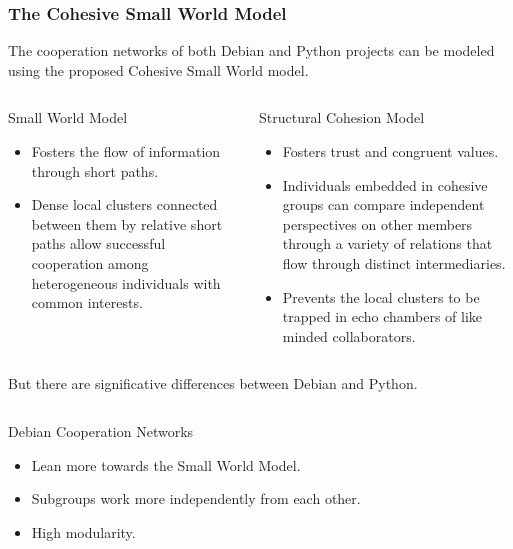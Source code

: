 \documentclass[ignorenonframetext,red,8pt,notes=hide]{beamer}
\begin{document}
\begin{frame}
\frametitle{The Cohesive Small World Model}

The cooperation networks of both Debian and Python projects can be modeled using the proposed Cohesive Small World model.


\begin{columns}[c]
\begin{column}{0.5\textwidth}
\begin{block}{Small World Model}
\begin{itemize}
\item Fosters the flow of information through short paths.
\item Dense local clusters connected between them by relative short paths allow successful cooperation among heterogeneous individuals with common interests.
\end{itemize}
\end{block}
\end{column}

\begin{column}{0.5\textwidth}

\begin{block}{Structural Cohesion Model}
\begin{itemize}
\item Fosters trust and congruent values.
\item Individuals embedded in cohesive groups can compare independent perspectives on other members through a variety of relations that flow through distinct intermediaries.
\item Prevents the local clusters to be trapped in echo chambers of like minded       collaborators.
\end{itemize}
\end{block}
\end{column}
\end{columns}

\pause

\vspace{0.2cm}
But there are significative differences between Debian and Python.

\begin{columns}[c]
\begin{column}{0.5\textwidth}
\begin{block}{Debian Cooperation Networks}
\begin{itemize}
\item Lean more towards the Small World Model.
\item Subgroups work more independently from each other.
\item High modularity.
\end{itemize}
\end{block}
\end{column}


\end{columns}
\end{frame}
\end{document}
